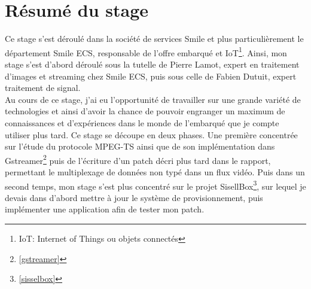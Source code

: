 \chapter*{Résumé du stage}
Ce stage s'est déroulé dans la société de services Smile et plus particulièrement le département Smile ECS, responsable de l'offre embarqué et IoT\footnote{IoT: Internet of Things ou objets connectés}. Ainsi, mon stage s'est d'abord déroulé sous la tutelle de Pierre Lamot, expert en traitement d'images et streaming chez Smile ECS, puis sous celle de Fabien Dutuit, expert traitement de signal.
\\
Au cours de ce stage, j'ai eu l'opportunité de travailler sur une grande variété de technologies et ainsi d'avoir la chance de pouvoir engranger un maximum de connaissances et d'expériences dans le monde de l'embarqué que je compte utiliser plus tard.
\newline
\newline
Ce stage se découpe en deux phases. Une première concentrée sur l'étude du protocole MPEG-TS ainsi que de son implémentation dans Gstreamer\footnote{\ref{gstreamer}} puis de l'écriture d'un patch décri plus tard dans le rapport, permettant le multiplexage de données non typé dans un flux vidéo. Puis dans un second temps, mon stage s'est plus concentré sur le projet SisellBox\footnote{\ref{sisselbox}}, sur lequel je devais dans d'abord mettre à jour le système de provisionnement, puis implémenter une application afin de tester mon patch.
